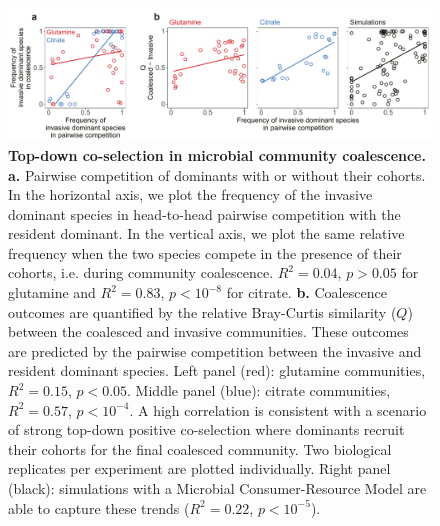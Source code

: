 \documentclass[a4paper,10pt]{article}
\begin{document}
\clearpage

\begin{figure}[!h]
\centering
\internallinenumbers
\includegraphics[width=15cm,keepaspectratio]{figs/fig2_v3.pdf}
\caption{\textbf{Top-down co-selection in microbial community coalescence.}
\textbf{a.} Pairwise competition of dominants with or without their cohorts.
In the horizontal axis, we plot the frequency of the invasive dominant species
in head-to-head pairwise competition with the resident dominant.
In the vertical axis, we plot the same relative frequency when the two species compete
in the presence of their cohorts, i.e. during community coalescence.
$R^2=0.04$, $p>0.05$ for glutamine and $R^2=0.83$, $p<10^{-8}$ for citrate.
\textbf{b.} Coalescence outcomes are quantified by the relative Bray-Curtis similarity
($Q$) between the coalesced and invasive communities.
These outcomes are predicted by the pairwise competition between the invasive and
resident dominant species.
Left panel (red): glutamine communities, $R^2=0.15$, $p<0.05$.
Middle panel (blue): citrate communities, $R^2=0.57$, $p<10^{-4}$.
A high correlation is consistent with a scenario of
strong top-down positive co-selection where dominants recruit their cohorts for the final
coalesced community. Two biological replicates per experiment are plotted individually.
Right panel (black): simulations with a Microbial Consumer-Resource Model are able
to capture these trends ($R^2=0.22$, $p<10^{-5}$).}
\label{fig2}
\end{figure}

\clearpage
\end{document}
